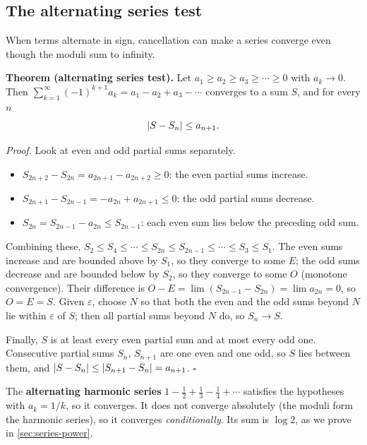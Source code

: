 \subsection{The alternating series test}

When terms alternate in sign, cancellation can make a series converge even though the moduli sum to infinity.

\textbf{Theorem (alternating series test).} Let $a_1\ge a_2\ge a_3\ge\cdots\ge0$ with $a_k\to0$. Then $\sum_{k=1}^\infty(-1)^{k+1}a_k=a_1-a_2+a_3-\cdots$ converges to a sum $S$, and for every $n$
\begin{equation}
\left\lvert S-S_n\right\rvert\le a_{n+1}.
\label{eq:series-alt-error}
\end{equation}

\emph{Proof.} Look at even and odd partial sums separately.
\begin{itemize}
\item $S_{2n+2}-S_{2n}=a_{2n+1}-a_{2n+2}\ge0$: the even partial sums increase.
\item $S_{2n+1}-S_{2n-1}=-a_{2n}+a_{2n+1}\le0$: the odd partial sums decrease.
\item $S_{2n}=S_{2n-1}-a_{2n}\le S_{2n-1}$: each even sum lies below the preceding odd sum.
\end{itemize}
Combining these, $S_2\le S_4\le\cdots\le S_{2n}\le S_{2n-1}\le\cdots\le S_3\le S_1$. The even sums increase and are bounded above by $S_1$, so they converge to some $E$; the odd sums decrease and are bounded below by $S_2$, so they converge to some $O$ (monotone convergence). Their difference is $O-E=\lim(S_{2n-1}-S_{2n})=\lim a_{2n}=0$, so $O=E=S$. Given $\varepsilon$, choose $N$ so that both the even and the odd sums beyond $N$ lie within $\varepsilon$ of $S$; then all partial sums beyond $N$ do, so $S_n\to S$.

Finally, $S$ is at least every even partial sum and at most every odd one. Consecutive partial sums $S_n$, $S_{n+1}$ are one even and one odd, so $S$ lies between them, and $\left\lvert S-S_n\right\rvert\le\left\lvert S_{n+1}-S_n\right\rvert=a_{n+1}$. $\square$

The \textbf{alternating harmonic series} $1-\tfrac12+\tfrac13-\tfrac14+\cdots$ satisfies the hypotheses with $a_k=1/k$, so it converges. It does not converge absolutely (the moduli form the harmonic series), so it converges \emph{conditionally}. Its sum is $\log2$, as we prove in \cref{sec:series-power}.

